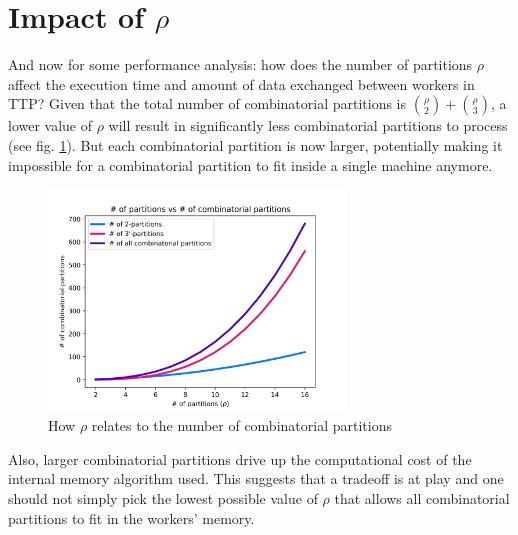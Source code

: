 \documentclass[paper=a4, fontsize=11pt]{scrartcl}
\begin{document}
\section{Impact of $\rho$}
And now for some performance analysis: how does the number of partitions $\rho$
affect the execution time and amount of data exchanged between workers in TTP?
Given that the total number of combinatorial partitions is $\binom{\rho}{2} +
\binom{\rho}{3}$, a lower value of $\rho$ will result in significantly less
combinatorial partitions to process (see fig. \ref{rho_comb}). But each
combinatorial partition is now larger, potentially making it impossible for a
combinatorial partition to fit inside a single machine anymore.

\begin{figure}[H]
    \centering
    \includegraphics[width=0.7\textwidth]{img/rho_comb}
    \caption{How $\rho$ relates to the number of combinatorial partitions}
    \label{rho_comb}
\end{figure}

Also, larger combinatorial partitions drive up the computational cost of the
internal memory algorithm used. This suggests that a tradeoff is at play and one
should not simply pick the lowest possible value of $\rho$ that allows all
combinatorial partitions to fit in the workers' memory.
\end{document}
